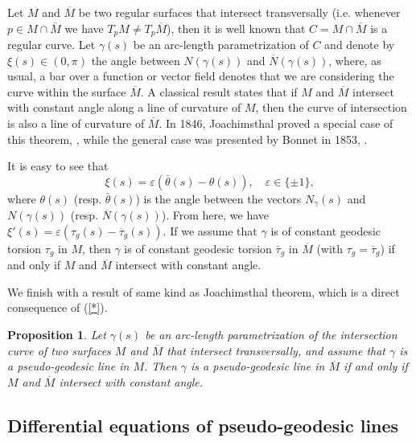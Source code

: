 \documentclass[11pt,a4paper]{article}
\def\e{\varepsilon}
\def\e{\varepsilon}
\def\ol#1{\overline{#1}}
\def\e{\varepsilon}
\def\g{\gamma}
\newtheorem{prop}[theo]{Proposition}
\begin{document}
Let $M$ and $\ol{M}$ be two regular surfaces that intersect transversally (i.e. whenever $p\in M\cap\ol{M}$ we have $T_pM\neq T_p\ol{M}$), then it is well known that $C=M\cap\ol{M}$ is a regular curve. Let $\g(s)$ be an arc-length parametrization of $C$ and denote by $\xi(s)\in(0,\pi)$ the angle between $N(\g(s))$ and $\ol{N}(\g(s))$, where, as usual, a bar over a function or vector field denotes that we are considering the curve within the surface $\ol M$. A classical result states that if $M$ and $\ol{M}$ intersect with constant angle along a line of curvature of $M$, then the curve of intersection is also a line of curvature of $\ol{M}$. In 1846, Joachimsthal proved a special case of this theorem, \cite{Joachimsthal}, while the general case was presented by Bonnet in 1853, \cite{Bonnet}.

It is easy to see that
\begin{equation}\label{*}
\xi(s)=\e(\bar\theta(s)-\theta(s)),\quad \e\in\{\pm1\},
\end{equation}
where $\theta(s)$ (resp. $\bar\theta(s)$) is the angle between the vectors $N_\gamma(s)$ and $N(\gamma(s))$ (resp. $\ol{N}(\gamma(s))$). From here, we have $\xi'(s)=\e(\tau_g(s)-\ol{\tau}_g(s))$.
If we assume that $\gamma$ is of constant geodesic torsion $\tau_g$ in $M$, then $\gamma$ is of constant geodesic torsion $\ol{\tau}_g$ in $\ol M$ (with $\tau_g=\ol{\tau}_g$) if and only if $M$ and $\ol{M}$ intersect with constant angle.

We finish with a result of same kind as Joachimsthal theorem, which is a direct consequence of (\ref{*}).

\begin{prop}\label{JoachimsthalEx2}
Let $\gamma(s)$ be an arc-length parame\-tri\-zation of the intersection curve of two surfaces $M$ and $\ol M$ that intersect transversally, and assume that $\gamma$ is a pseudo-geodesic line in $M$. Then $\gamma$ is a pseudo-geodesic line in $\ol M$ if and only if $M$ and $\ol{M}$ intersect with constant angle.
\end{prop}

\subsection{Differential equations of pseudo-geodesic lines}
\end{document}
